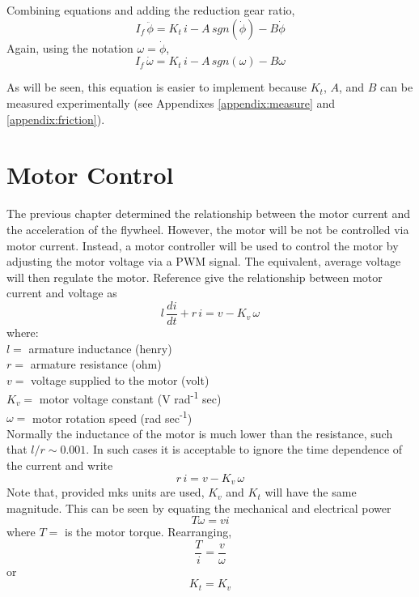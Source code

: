 \documentclass[12pt,letterpaper]{article}
\begin{document}
Combining equations and adding the reduction gear ratio,
%
\begin{equation}
    I_{f} \, \ddot{\phi}  = K_{t} \, i - A \, sgn(\dot{\phi} ) - B \dot{\phi}
\end{equation}
%
Again, using the notation $\omega = \dot{\phi}$,
%
\begin{equation}
    I_{f} \, \dot{\omega}  = K_{t} \, i - A \, sgn(\omega) - B \omega \label{wheel}
\end{equation}
%

As will be seen, this equation is easier to implement because $K_{t}$, $A$, and $B$ can be measured experimentally (see Appendixes \ref{appendix:measure} and \ref{appendix:friction}).







\section{Motor Control}
The previous chapter determined the relationship between the motor current and the acceleration of the flywheel.  
However, the motor will be not be controlled via motor current.  Instead, a motor controller will be used to control the 
motor by adjusting the motor voltage via a PWM signal.  The equivalent, average voltage will then regulate the motor.  
Reference \cite{monograph} give the relationship between motor current and voltage as
%
\begin{equation}
    l \, \frac{di}{dt} + r \,i = v - K_{v} \, \omega
\end{equation}
%
where: \\
$l =$ armature inductance (henry) \\
$r =$ armature resistance (ohm) \\
$v =$ voltage supplied to the motor (volt) \\
$K_{v} =$ motor voltage constant (V  rad\textsuperscript{-1} sec) \\
$\omega =$ motor rotation speed (rad sec\textsuperscript{-1}) \\

Normally the inductance of the motor is much lower than the resistance, such that $l/r \sim 0.001$.  
In such cases it is acceptable to ignore the time dependence of the current and write
%
\begin{equation}
    r \,i = v - K_{v} \, \omega \label{motor}
\end{equation}
%
Note that, provided mks units are used, $K_{v}$ and $K_{t}$ will have the same magnitude.  This can be seen by equating the 
mechanical and electrical power
%
\begin{equation}
    T \omega = v i
\end{equation}
%
where $T =$ is the motor torque.
Rearranging,
%
\begin{equation}
    \frac{T}{i} = \frac{v}{\omega}
\end{equation}
%
or
%
\begin{equation}
    K_{t} = K_{v} 
\end{equation}
%
\end{document}
